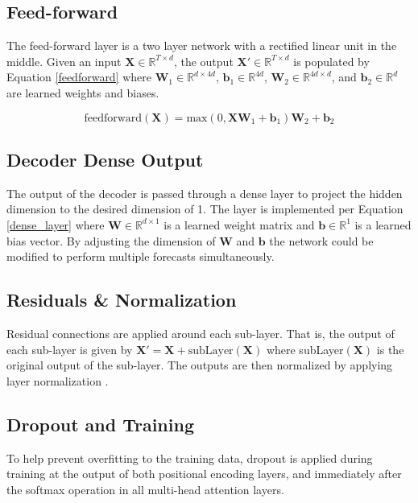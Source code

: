 \subsection{Feed-forward}
The feed-forward layer is a two layer network with a rectified linear unit in the middle.
Given an input $\boldsymbol{X} \in \mathbb{R}^{T \times d}$, the output $\boldsymbol{X'} \in \mathbb{R}^{T \times d}$ is populated by Equation \ref{feedforward} where $\boldsymbol{W}_1 \in \mathbb{R}^{d \times 4d}$, $\boldsymbol{b}_1 \in \mathbb{R}^{4d}$, $\boldsymbol{W}_2 \in \mathbb{R}^{4d \times d}$, and $\boldsymbol{b}_2 \in \mathbb{R}^{d}$ are learned weights and biases.

\begin{equation} \label{feedforward}
\text{feedforward}(\boldsymbol{X}) = \text{max}(0, \boldsymbol{X}  \boldsymbol{W}_1 + \boldsymbol{b}_1)  \boldsymbol{W}_2 + \boldsymbol{b}_2
\end{equation}

\subsection{Decoder Dense Output}
The output of the decoder is passed through a dense layer to project the hidden dimension to the desired dimension of 1.
The layer is implemented per Equation \ref{dense_layer} where $\boldsymbol{W} \in \mathbb{R}^{d \times 1}$ is a learned weight matrix and $\boldsymbol{b} \in \mathbb{R}^{1}$ is a learned bias vector.
By adjusting the dimension of $\boldsymbol{W}$ and $\boldsymbol{b}$ the network could be modified to perform multiple forecasts simultaneously.


\subsection{Residuals \& Normalization}
Residual connections \cite{He2015} are applied around each sub-layer.
That is, the output of each sub-layer is given by $\boldsymbol{X'} = \boldsymbol{X} + \text{subLayer}(\boldsymbol{X})$ where subLayer$(\boldsymbol{X})$ is the original output of the sub-layer.
The outputs are then normalized by applying layer normalization \cite{Ba2016}.

\subsection{Dropout and Training}
To help prevent overfitting to the training data, dropout \cite{srivastava14a} is applied during training at the output of both positional encoding layers, and immediately after the softmax operation in all multi-head attention layers.

